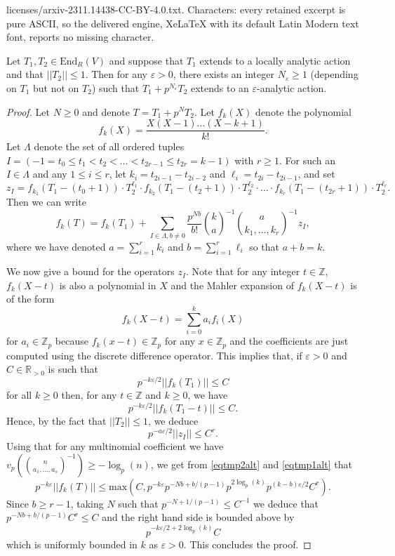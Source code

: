 \documentclass[10pt,a4paper]{amsart}
\def\Z{{\mathbb{Z}}}
\def\epsilon{\varepsilon}
\def\zp{{\Z_p}}
\newcommand{\mbb}[1]{\mathbb{#1}}
\begin{document}
licenses/arxiv-2311.14438-CC-BY-4.0.txt. Characters: every retained excerpt is pure ASCII, so the delivered engine, XeLaTeX with its default Latin Modern text font, reports no missing character.
\begin{proposition} \label{Lemmaepsan1}
Let $T_1, T_2 \in \mathrm{End}_R(V)$ and suppose that $T_1$ extends to a locally analytic action and that $|\!|T_2|\!| \leq 1$. Then for any $\epsilon > 0$, there exists an integer $N_\epsilon \geq 1$ (depending on $T_1$ but not on $T_2$) such that $T_1 + p^{N_\epsilon} T_2$ extends to an $\epsilon$-analytic action.  
\end{proposition}

\begin{proof}
Let $N \geq 0$ and denote $T = T_1 + p^N T_2$. Let $f_k(X)$ denote the polynomial
\[ f_k(X) = \frac{X (X-1) \ldots (X - k + 1)}{k!}. \]
Let $\Lambda$ denote the set of all ordered tuples $I = (-1 = t_0 \leq t_1 < t_2 < \ldots < t_{2r-1} \leq t_{2r} = k-1)$ with $r \geq 1$. For such an $I \in \Lambda$ and any $1 \leq i \leq r$, let $k_i = t_{2i-1} - t_{2i-2}$ and $\ell_i = t_{2i} - t_{2i - 1}$, and set
 \[ z_I = f_{k_1}(T_1 - (t_0 + 1)) \cdot T_2^{\ell_1} \cdot f_{k_2}(T_1 - (t_2 + 1)) \cdot T_2^{\ell_2} \cdot \ldots \cdot f_{k_r}(T_1 - (t_{2r} + 1)) \cdot T_2^{\ell_r} .\]
Then we can write
\begin{equation} \label{eqtmp2alt}
f_k(T) = f_k(T_1) + \sum_{I \in \Lambda, b \neq 0} \frac{p^{N b}}{b!} \binom{k}{a}^{-1} \binom{a}{k_1, \ldots, k_r}^{-1} z_I,
\end{equation}
where we have denoted $a = \sum_{i=1}^r k_i$ and $b = \sum_{i=1}^r \ell_i$ so that $a + b = k$.

We now give a bound for the operators $z_I$. Note that for any integer $t \in \Z$, $f_k(X - t)$ is also a polynomial in $X$ and the Mahler expansion of $f_k(X - t)$ is of the form
\[ f_k(X - t) = \sum_{i = 0}^k a_i f_i(X) \] 
for $a_i \in \Z_p$ because $f_k(x - t) \in \zp$ for any $x \in \zp$ and the coefficients are just computed
using the discrete difference operator. This implies that, if $\epsilon > 0$ and $C \in \mbb{R}_{> 0}$ is such that
\[ p^{-k \epsilon / 2} |\!| f_k(T_1) |\!| \leq C \]
for all $k \geq 0$ then,
for any $t \in \Z$ and $k \geq 0$, we have
\[
p^{-k \epsilon / 2} |\!|f_k(T_1 - t)|\!| \leq C.
\]
Hence, by the fact that $|\!|T_2|\!| \leq 1$, we deduce
\begin{equation} \label{eqtmp1alt} p^{- a \epsilon / 2} |\!|z_I|\!| \leq C^{r}.
\end{equation}
Using that for any multinomial coefficient we have $v_p( \binom{n}{a_1, \ldots, a_s}^{-1} ) \geq - \log_p(n)$, we get from \eqref{eqtmp2alt} and \eqref{eqtmp1alt} that
\[ p^{-k \epsilon} |\!|f_k(T) |\!| \leq \mathrm{max}(C, p^{-k \epsilon} p^{-Nb + b/(p-1)} p^{2 \log_p(k)} p^{(k - b) \epsilon / 2} C^r ). \]
Since $b \geq r - 1$, taking $N$ such that $p^{-N + 1/(p-1)} \leq C^{-1}$ we deduce that $p^{-Nb + b/(p-1)} C^r \leq C$ and the right hand side is bounded above by
\[ p^{-k \epsilon / 2 + 2 \log_p(k)} C \]
which is uniformly bounded in $k$ as $\epsilon > 0$. This concludes the proof.
\end{proof}
\end{document}
